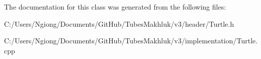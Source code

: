 The documentation for this class was generated from the following files\+:\begin{DoxyCompactItemize}
\item 
C\+:/\+Users/\+Ngiong/\+Documents/\+Git\+Hub/\+Tubes\+Makhluk/v3/header/Turtle.\+h\item 
C\+:/\+Users/\+Ngiong/\+Documents/\+Git\+Hub/\+Tubes\+Makhluk/v3/implementation/Turtle.\+cpp\end{DoxyCompactItemize}
